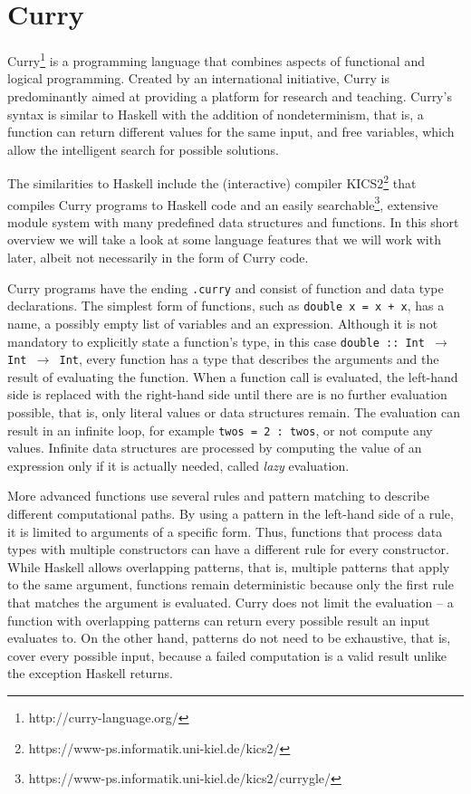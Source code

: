 \documentclass[fleqn, abstract=on]{scrreprt}
\begin{document}
\section{Curry}
Curry\footnote{http://curry-language.org/} is a programming language that combines aspects of functional and logical programming. Created by an international initiative, Curry is predominantly aimed at providing a platform for research and teaching.\cite{curryintro} Curry's syntax is similar to Haskell with the addition of nondeterminism, that is, a function can return different values for the same input, and free variables, which allow the intelligent search for possible solutions. 
\par
The similarities to Haskell include the (interactive) compiler KICS2\footnote{https://www-ps.informatik.uni-kiel.de/kics2/} that compiles Curry programs to Haskell code and  an easily searchable\footnote{https://www-ps.informatik.uni-kiel.de/kics2/currygle/}, extensive module system with many predefined data structures and functions. In this short overview we will take a look at some language features that we will work with later, albeit not necessarily in the form of Curry code.\\
\par\noindent
Curry programs have the ending \texttt{.curry} and consist of function and data type declarations. The simplest form of functions, such as \texttt{double x = x + x}, has a name, a possibly empty list of variables and an expression. Although it is not mandatory to explicitly state a function's type, in this case \texttt{double :: Int $\rightarrow$ Int $\rightarrow$ Int}, every function has a type that describes the arguments and the result of evaluating the function. When a function call is evaluated, the left-hand side is replaced with the right-hand side until there are is no further evaluation possible, that is, only literal values or data structures remain. The evaluation can result in an infinite loop, for example \texttt{twos = 2 : twos}, or not compute any values. Infinite data structures are processed by computing the value of an expression only if it is actually needed, called \textit{lazy} evaluation.\\
\par \noindent
More advanced functions use several rules and pattern matching to describe different computational paths. By using a pattern in the left-hand side of a rule, it is limited to arguments of a specific form. Thus, functions that process data types with multiple constructors can have a different rule for every constructor. While Haskell allows overlapping patterns, that is, multiple patterns that apply to the same argument, functions remain deterministic because only the first rule that matches the argument is evaluated. Curry does not limit the evaluation -- a function with overlapping patterns can return every possible result an input evaluates to. On the other hand, patterns do not need to be exhaustive, that is, cover every possible input, because a failed computation is a valid result unlike the exception Haskell returns.\\
\end{document}
